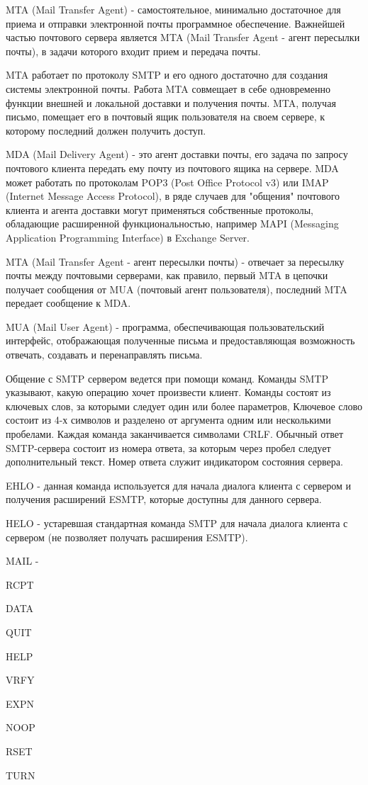 \documentclass[a4paper,12pt]{report}
\begin{document}
	MTA (Mail Transfer Agent) - самостоятельное, минимально достаточное для приема и отправки электронной почты программное обеспечение. Важнейшей частью почтового сервера является MTA (Mail Transfer Agent - агент пересылки почты), в задачи которого входит прием и передача почты.

	MTA работает по протоколу SMTP и его одного достаточно для создания системы электронной почты. Работа MTA совмещает в себе одновременно функции внешней и локальной доставки и получения почты. MTA, получая письмо, помещает его в почтовый ящик пользователя на своем сервере, к которому последний должен получить доступ.

	MDA (Mail Delivery Agent) - это агент доставки почты, его задача по запросу почтового клиента передать ему почту из почтового ящика на сервере. MDA может работать по протоколам POP3 (Post Office Protocol v3) или IMAP (Internet Message Access Protocol), в ряде случаев для "общения" почтового клиента и агента доставки могут применяться собственные протоколы, обладающие расширенной функциональностью, например MAPI (Messaging Application Programming Interface) в Exchange Server.

	MTA (Mail Transfer Agent - агент пересылки почты) - отвечает за пересылку почты между почтовыми серверами, как правило, первый MTA в цепочки получает сообщения от MUA (почтовый агент пользователя), последний MTA передает сообщение к MDA.

	MUA (Mail User Agent) - программа, обеспечивающая пользовательский интерфейс, отображающая полученные письма и предоставляющая возможность отвечать, создавать и перенаправлять письма.

	Общение с SMTP сервером ведется при помощи команд. Команды SMTP указывают, какую операцию хочет произвести клиент. Команды состоят из ключевых слов, за которыми следует один или более параметров, Ключевое слово состоит из 4-х символов и разделено от аргумента одним или несколькими пробелами. Каждая команда заканчивается символами CRLF. Обычный ответ SMTP-сервера состоит из номера ответа, за которым через пробел следует дополнительный текст. Номер ответа служит индикатором состояния сервера.

	\begin{itemsize}
		\item EHLO - данная команда используется для начала диалога клиента с сервером и получения расширений ESMTP, которые доступны для данного сервера.
		\item HELO - устаревшая стандартная команда SMTP для начала диалога клиента с сервером (не позволяет получать расширения ESMTP).
		\item MAIL - 
		\item RCPT
		\item DATA
		\item QUIT
		\item HELP
		\item VRFY
		\item EXPN
		\item NOOP
		\item RSET
		\item TURN
	\end{itemsize}
\end{document}
